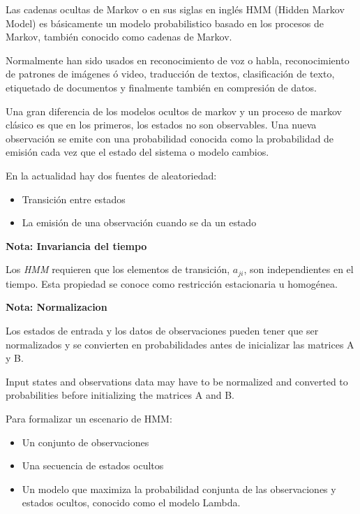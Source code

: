 
Las cadenas ocultas de Markov o en sus siglas en inglés HMM (Hidden Markov Model) es básicamente un modelo probabilistico basado en los procesos de Markov, también conocido como cadenas de Markov. 


Normalmente han sido usados en reconocimiento de voz o habla, reconocimiento de patrones de imágenes ó video, traducción de textos, clasificación de texto, etiquetado de documentos y finalmente también en compresión de datos.

Una gran diferencia de los modelos ocultos de markov y un proceso de markov clásico es que en los primeros, los estados no son observables.  Una nueva observación se emite con una probabilidad conocida como la probabilidad de emisión cada vez que el estado del sistema o modelo cambios.

En la actualidad hay dos fuentes de aleatoriedad:

\begin{itemize}
	\item Transición entre estados
	\item La emisión de una observación cuando se da un estado
\end{itemize}




\textbf{Nota: Invariancia del tiempo}

Los \textit{HMM} requieren que los elementos de transición, $a_{ji}$, son independientes en el tiempo. Esta propiedad se conoce como restricción estacionaria u homogénea.

\textbf{Nota: Normalizacion}

Los estados de entrada y los datos de observaciones pueden tener que ser normalizados y se convierten en probabilidades antes de inicializar las matrices A y B.

Input states and observations data may have to be normalized and converted to probabilities before initializing the matrices A and B.




Para formalizar un escenario de HMM:

\begin{itemize}
	\item Un conjunto de observaciones
	\item Una secuencia de estados ocultos
	\item Un modelo que maximiza la probabilidad conjunta de las observaciones y estados ocultos, conocido como el modelo Lambda.

\end{itemize}



